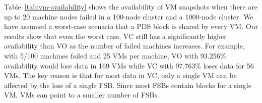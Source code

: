  Table~\ref{tab:vm-availability} shows the availability of VM snapshots when 
there are up to 20 machine nodes failed in a 100-node cluster and  a 1000-node cluster. 
We have assumed a worst-case scenario that  a PDS block is shared by every VM. 
Our results show that even the worst case,  VC  still has a significantly  higher availability than VO as the number of
failed machines increases.
For example, with 5/100 machines failed and 25 VMs per machine, VO with 93.256\% availability would lose data in 169 VMs 
while VC with 97.763\% loses data for 56 VMs.
The key reason is that for most data in VC, only a single
VM can be affected by the loss of a single FSB. Since most FSBs contain blocks for a single VM, VMs can point to a smaller number of FSBs.


